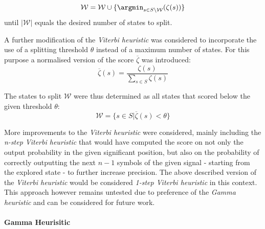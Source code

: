 $$\mathcal{W} = \mathcal{W} \cup \{\argmin_{s\in S\setminus \mathcal{W}}(\zeta(s))\}$$
until $|\mathcal{W}|$ equals the desired number of states to split.

A further modification of the \emph{Viterbi heuristic} was considered to incorporate the use of a splitting threshold $\theta$ instead of a maximum number of states. For this purpose a normalised version of the score $\overline{\zeta}$ was introduced:
$$\overline{\zeta}(s) = \frac{\zeta(s)}{\sum_{s\in S}\zeta(s)}$$

The states to split $\mathcal{W}$ were thus determined as all states that scored below the given threshold $\theta$:
$$\mathcal{W} = \{s\in S|\overline\zeta(s) < \theta\}$$

More improvements to the \emph{Viterbi heuristic} were considered, mainly including the \emph{n-step Viterbi heuristic} that would have computed the score on not only the output probability in the given significant position, but also on the probability of correctly outputting the next $n -1$ symbols of the given signal - starting from the explored state - to further increase precision. The above described version of the \emph{Viterbi heuristic} would be considered \emph{1-step Viterbi heuristic} in this context. This approach however remains untested due to preference of the \emph{Gamma heuristic} and can be considered for future work.

\paragraph{Gamma Heurisitic}




